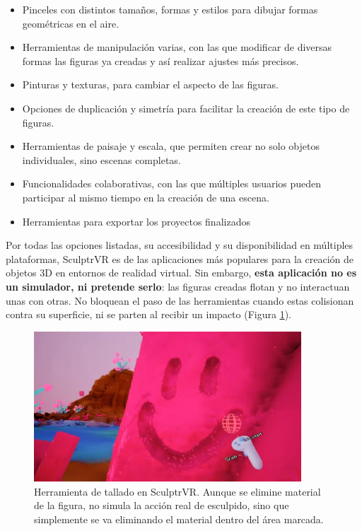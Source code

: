 \begin{itemize}
	\item Pinceles con distintos tamaños, formas y estilos para dibujar formas geométricas en el aire.
	\item Herramientas de manipulación varias, con las que modificar de diversas formas las figuras ya creadas y así realizar ajustes más precisos.
	\item Pinturas y texturas, para cambiar el aspecto de las figuras.
	\item Opciones de duplicación y simetría para facilitar la creación de este tipo de figuras.
	\item Herramientas de paisaje y escala, que permiten crear no solo objetos individuales, sino escenas completas.
	\item Funcionalidades colaborativas, con las que múltiples usuarios pueden participar al mismo tiempo en la creación de una escena.
	\item Herramientas para exportar los proyectos finalizados
\end{itemize}

Por todas las opciones listadas, su accesibilidad y su disponibilidad en múltiples plataformas, SculptrVR es de las aplicaciones más populares para la creación de objetos 3D en entornos de realidad virtual. Sin embargo, \textbf{esta aplicación no es un simulador, ni pretende serlo}: las figuras creadas flotan y no interactuan unas con otras. No bloquean el paso de las herramientas cuando estas colisionan contra su superficie, ni se parten al recibir un impacto (Figura \ref{fig:sculptvr2}).

\begin{figure}[H]
	\centering
	\includegraphics[width=10cm]{imagenes/sculptrvr2}
	\caption{Herramienta de tallado en SculptrVR. Aunque se elimine material de la figura, no simula la acción real de esculpido, sino que simplemente se va eliminando el material dentro del área marcada.}
	\label{fig:sculptvr2}
\end{figure}

